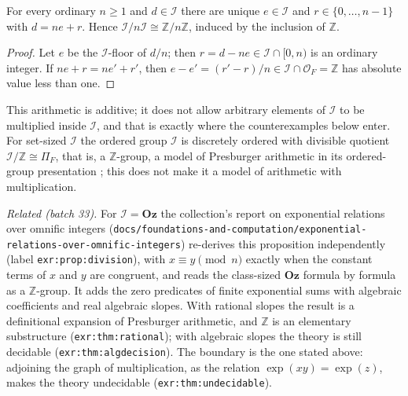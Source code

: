 \documentclass[11pt,letterpaper]{article}
\numberwithin{equation}{section}
\theoremstyle{definition}
\theoremstyle{remark}
\newcommand{\Oz}{\mathbf{Oz}}
\newcommand{\Z}{\mathbb Z}
\newcommand{\OO}{\mathcal O}
\newcommand{\cI}{\mathcal I}
\begin{document}
\begin{proposition}\label{trigonometry:per:prop:division}
For every ordinary $n\ge1$ and $d\in\cI$ there are unique $e\in\cI$ and $r\in\{0,\dots,n-1\}$ with
$d=ne+r$. Hence $\cI/n\cI\cong\Z/n\Z$, induced by the inclusion of $\Z$.
\end{proposition}
\begin{proof}
Let $e$ be the $\cI$-floor of $d/n$; then $r=d-ne\in\cI\cap[0,n)$ is an ordinary integer. If
$ne+r=ne'+r'$, then $e-e'=(r'-r)/n\in\cI\cap\OO_F=\Z$ has absolute value less than one.
\end{proof}
This arithmetic is additive; it does not allow arbitrary elements of $\cI$ to be multiplied inside
$\cI$, and that is exactly where the counterexamples below enter. For set-sized $\cI$ the ordered
group $\cI$ is discretely ordered with divisible quotient $\cI/\Z\cong\Pi_F$, that is, a $\Z$-group, a
model of Presburger arithmetic in its ordered-group presentation \cite[\S2]{Jerabek}; this does not make
it a model of arithmetic with multiplication.

\emph{Related (batch 33).} For $\cI=\Oz$ the collection's report on exponential relations over omnific
integers (\nolinkurl{docs/foundations-and-computation/exponential-relations-over-omnific-integers})
re-derives this proposition independently (label \texttt{exr:prop:division}), with $x\equiv y\pmod n$
exactly when the constant terms of $x$ and $y$ are congruent, and reads the class-sized $\Oz$ formula by
formula as a $\Z$-group. It adds the zero predicates of finite exponential sums with algebraic
coefficients and real algebraic slopes. With rational slopes the result is a definitional expansion of
Presburger arithmetic, and $\Z$ is an elementary substructure (\texttt{exr:thm:rational}); with algebraic
slopes the theory is still decidable (\texttt{exr:thm:algdecision}). The boundary is the one stated
above: adjoining the graph of multiplication, as the relation $\exp(xy)=\exp(z)$, makes the theory
undecidable (\texttt{exr:thm:undecidable}).
\end{document}
